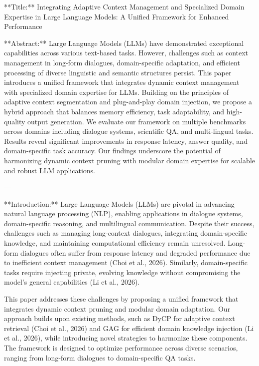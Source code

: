 **Title:**  
Integrating Adaptive Context Management and Specialized Domain Expertise in Large Language Models: A Unified Framework for Enhanced Performance  

**Abstract:**  
Large Language Models (LLMs) have demonstrated exceptional capabilities across various text-based tasks. However, challenges such as context management in long-form dialogues, domain-specific adaptation, and efficient processing of diverse linguistic and semantic structures persist. This paper introduces a unified framework that integrates dynamic context management with specialized domain expertise for LLMs. Building on the principles of adaptive context segmentation and plug-and-play domain injection, we propose a hybrid approach that balances memory efficiency, task adaptability, and high-quality output generation. We evaluate our framework on multiple benchmarks across domains including dialogue systems, scientific QA, and multi-lingual tasks. Results reveal significant improvements in response latency, answer quality, and domain-specific task accuracy. Our findings underscore the potential of harmonizing dynamic context pruning with modular domain expertise for scalable and robust LLM applications.  

---

**Introduction:**  
Large Language Models (LLMs) are pivotal in advancing natural language processing (NLP), enabling applications in dialogue systems, domain-specific reasoning, and multilingual communication. Despite their success, challenges such as managing long-context dialogues, integrating domain-specific knowledge, and maintaining computational efficiency remain unresolved. Long-form dialogues often suffer from response latency and degraded performance due to inefficient context management (Choi et al., 2026). Similarly, domain-specific tasks require injecting private, evolving knowledge without compromising the model's general capabilities (Li et al., 2026).  

This paper addresses these challenges by proposing a unified framework that integrates dynamic context pruning and modular domain adaptation. Our approach builds upon existing methods, such as DyCP for adaptive context retrieval (Choi et al., 2026) and GAG for efficient domain knowledge injection (Li et al., 2026), while introducing novel strategies to harmonize these components. The framework is designed to optimize performance across diverse scenarios, ranging from long-form dialogues to domain-specific QA tasks.  

